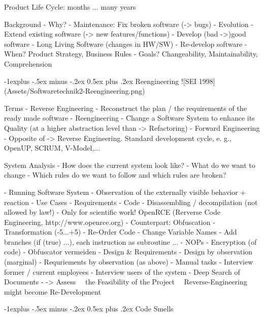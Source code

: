 \documentclass[a4paper]{article}
\makeatletter
\renewcommand{\subsection}{\@startsection{subsection}{2}{0mm}%
                                {-1explus -.5ex minus -.2ex}%
                                {0.5ex plus .2ex}%
                                {\normalfont\normalsize\bfseries}}
\makeatother
\begin{document}
\begin{multicols}{3}
  Product Life Cycle: months ... many years
  
  Background 
  - Why?
      - Maintenance: Fix broken software (-> bugs)
      - Evolution
          - Extend existing software (-> new features/functions)
          - Develop (bad ->)good software
          - Long Living Software (changes in HW/SW)
          - Re-develop software
  - When? Product Strategy, Business Rules
  - Goals? Changeability, Maintainability, Comprehension
  
  \subsection{Reengineering}
  ![SEI 1998](Assets/Softwaretechnik2-Reengineering.png)
  
  Terms
  - Reverse Engineering
      - Reconstruct the plan / the requirements of the ready made software
  - Reengineering
      - Change a Software System to enhance its Quality (at a higher abstraction level than -> Refactoring)
  - Forward Engineering
      - Opposite of -> Reverse Engineering. Standard development cycle, e. g., OpenUP, SCRUM, V-Model,...
  
  System Analysis
  - How does the current system look like?
  - What do we want to change
  - Which rules do we want to follow and which rules are broken?
  
  - Running Software System
      - Observation of the externally visible behavior + reaction
      - Use Cases
      - Requirements
  - Code
      - Disassembling / decompilation (not allowed by law!)
          - Only for scientific work! OpenRCE (Rerverse Code Engineering, http://www.openrce.org)
      - Counterpart: Obfuscation
          - Transformation (-5...+5)
          - Re-Order Code
          - Change Variable Names
          - Add branches (if (true) ...), each instruction as subroutine ...
          - NOPs
          - Encryption (of code)
      - Obfuscator vermeiden
  - Design \& Requirements
      - Design by observation (marginal)
      - Requriements by observation (as above)
      - Manual tasks
          - Interview former / current employees
          - Interview users of the system
          - Deep Search of Documents
          - -> Assess ~~the Feasibility of the Project~~ Reverse-Engineering might become Re-Development
  
  
  \subsection{Code Smells}

\end{multicols}
\end{document}
